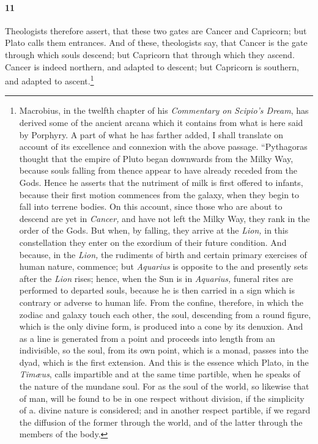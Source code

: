 \documentclass[a4paper,12pt]{article}
\begin{document}
\paragraph{11} Theologists therefore assert, that these two gates are Cancer
and Capricorn; but Plato calls them entrances. And of these, theologists say,
that Cancer is the gate through which souls descend; but Capricorn that through
which they ascend. Cancer is indeed northern, and adapted to descent; but
Capricorn is southern, and adapted to ascent.\footnote{Macrobius, in the
twelfth chapter of his \textit{Commentary on Scipio's Dream}, has derived some of the
ancient arcana which it contains from what is here said by Porphyry. A part of
what he has farther added, I shall translate on account of its excellence and
connexion with the above passage. ``Pythagoras thought that the empire of Pluto
began downwards from the Milky Way, because souls falling from thence appear to
have already receded from the Gods. Hence he asserts that the nutriment of milk
is first offered to infants, because their first motion commences from the
galaxy, when they begin to fall into terrene bodies. On this account, since
those who are about to descend are yet in \textit{Cancer,} and have not left
the Milky Way, they rank in the order of the Gods. But when, by falling, they
arrive at the \textit{Lion,} in this constellation they enter on the exordium
of their future condition. And because, in the \textit{Lion,} the rudiments of
birth and certain primary exercises of human nature, commence; but
\textit{Aquarius} is opposite to the and presently sets after the \textit{Lion}
rises; hence, when the Sun is in \textit{Aquarius,} funeral rites are performed
to departed souls, because he is then carried in a sign which is contrary or
adverse to human life. From the confine, therefore, in which the zodiac and
galaxy touch each other, the soul, descending from a round figure, which is the
only divine form, is produced into a cone by its denuxion. And as a line is
generated from a point and proceeds into length from an indivisible, so the
soul, from its own point, which is a monad, passes into the dyad, which is the
first extension. And this is the essence which Plato, in the \textit{Tim{\ae}us}, calls
impartible and at the same time partible, when he speaks of the nature of the
mundane soul. For as the soul of the world, so likewise that of man, will be
found to be in one respect without division, if the simplicity of a. divine
nature is considered; and in another respect partible, if we regard the
diffusion of the former through the world, and of the latter through the
members of the body.

}
\end{document}
